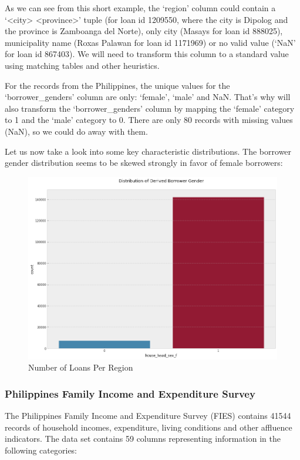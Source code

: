 \documentclass{article}
\begin{document}
As we can see from this short example, the ‘region’ column could contain a ‘<city> <province>’ tuple (for loan id 1209550, where the city is Dipolog and the province is Zamboanga del Norte), only city (Masays for loan id 888025), municipality name (Roxas Palawan for loan id 1171969) or no valid value (‘NaN’ for loan id 867403). We will need to transform this column to a standard value using matching tables and other heuristics.

For the records from the Philippines, the unique values for the ‘borrower\_genders’ column are only: ‘female’, ‘male’ and NaN. That’s why will also transform the ‘borrower\_genders’ column by mapping the ‘female’ category to 1 and the ‘male’ category to 0. There are only 80 records with missing values (NaN), so we could do away with them.

Let us now take a look into some key characteristic distributions. The borrower gender distribution seems to be skewed strongly in favor of female borrowers:

\begin{figure}[H]
\caption{Number of Loans Per Region}
\centering
\includegraphics[width = 0.7 \textwidth]{borrower_gender_distribution}
\end{figure}



\subsubsection{Philippines Family Income and Expenditure Survey}
The Philippines Family Income and Expenditure Survey (FIES) contains 41544 records of household incomes, expenditure, living conditions and other affluence indicators. The data set contains 59 columns representing information in the following categories:
\end{document}
